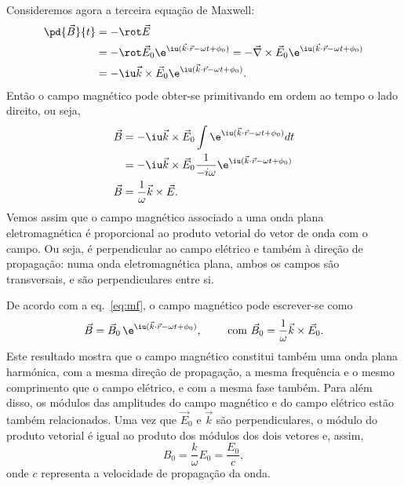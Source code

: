 Consideremos agora a terceira equação de Maxwell:
\begin{align*}
  \pd{\vec B}{t}&=-\rot\vec E\\
                &=-\rot \vec E_0\e^{\iu(\vec k\cdot\vec r-\omega t+\phi_0)}
  =-\vec \nabla\times\vec E_0\e^{\iu(\vec k\cdot\vec r-\omega t+\phi_0)}\\
  &=-\iu\vec k\times\vec E_0\e^{\iu(\vec k\cdot\vec r-\omega t+\phi_0)}.
\end{align*}
Então o campo magnético pode obter-se primitivando em ordem ao tempo o lado
direito, ou seja,
\begin{align}
  \vec B&=-\iu\vec k\times\vec E_0\int\e^{\iu(\vec k\cdot\vec r-\omega
          t+\phi_0)}dt\nonumber\\
          &=-\iu\vec k\times\vec E_0\frac{1}{-i\omega}
            \e^{\iu(\vec k\cdot\vec r-\omega t+\phi_0)}\nonumber\\
            \vec B&=\frac{1}{\omega}\vec k\times \vec E.\label{eq:mf}
\end{align}
Vemos assim que o campo magnético associado a uma onda plana eletromagnética é
proporcional ao produto vetorial do vetor de onda com o campo. Ou seja,
é perpendicular ao campo elétrico e também à direção de propagação: numa onda
eletromagnética plana, ambos os campos são transversais, e são perpendiculares
entre si. 

De acordo com a eq.~\eqref{eq:mf}, o campo magnético pode escrever-se como
\begin{equation*}
  \vec B=\vec B_0\,\e^{\iu(\vec k\cdot\vec r-\omega t+\phi_0)},\qquad
  \text{ com } 
  \vec B_0=\frac{1}{\omega}\vec k\times\vec E_0.
\end{equation*}
Este resultado mostra que o campo magnético constitui também uma onda plana
harmónica, com a mesma direção de propagação, a mesma frequência e o mesmo
comprimento que o campo elétrico, e com a mesma fase também. Para além disso, os
módulos das amplitudes do campo magnético e do campo elétrico estão também
relacionados. Uma vez que $\vec E_0$ e $\vec k$ são perpendiculares, o módulo do
produto vetorial é igual ao produto dos módulos dos dois vetores e, assim,
\begin{equation}\label{eq:b0e0}
  B_0 = \frac{k}{\omega}E_0=\frac{E_0}{c},
\end{equation}
onde $c$ representa a velocidade de propagação da onda.


